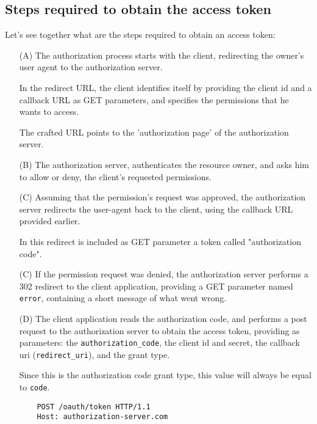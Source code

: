\subsection{Steps required to obtain the access token}
Let's see together what are the steps required to obtain an access token:
\begin{enumerate}
    \item[(A)]
        The authorization process starts with the client, redirecting the owner's user agent
        to the authorization server.

        In the redirect URL, the client identifies itself by providing the
        client id and a callback URL as GET parameters, and specifies the
        permissions that he wants to access.

        The crafted URL points to the 'authorization page' of the authorization server.

    \item[(B)]
        The authorization server, authenticates the resource owner, and asks him to allow or
        deny, the client's requested permissions.

    \item[(C)]
        Assuming that the permission's request was approved, the authorization server
        redirects the user-agent back to the client, using the callback URL provided earlier.

        In this redirect is included as GET parameter a token called "authorization code".

    \item[(C)]
        If the permission request was denied, the authorization server performs
        a 302 redirect to the client application, providing a GET parameter
        named \texttt{error}, containing a short message of what went wrong.

    \item[(D)]
        The client application reads the authorization code, and performs a post request
        to the authorization server to obtain the access token, providing as parameters:
        the \texttt{authorization\_code}, the client id and secret, the callback
        uri (\texttt{redirect\_uri}), and the grant type.

        Since this is the authorization code grant type, this value will always
        be equal to \texttt{code}.


        \begin{verbatim}
    POST /oauth/token HTTP/1.1
    Host: authorization-server.com


\end{verbatim}
\end{enumerate}
